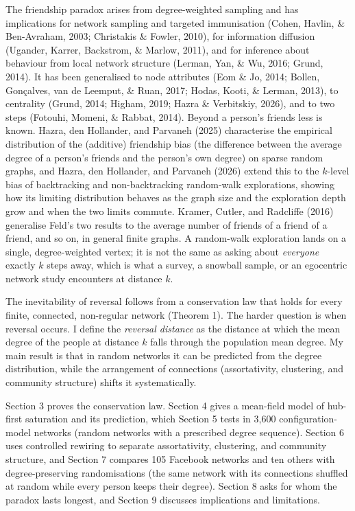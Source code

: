 \documentclass{nws}
\begin{document}
The friendship paradox arises from degree-weighted sampling and has implications for
network sampling and targeted immunisation (Cohen, Havlin, \& Ben-Avraham, 2003;
Christakis \& Fowler, 2010), for information diffusion (Ugander, Karrer, Backstrom, \&
Marlow, 2011), and for inference about behaviour from local network structure (Lerman,
Yan, \& Wu, 2016; Grund, 2014). It has been generalised to node attributes (Eom \& Jo,
2014; Bollen, Gon\c{c}alves, van de Leemput, \& Ruan, 2017; Hodas, Kooti, \& Lerman,
2013), to centrality (Grund, 2014; Higham, 2019; Hazra \& Verbitskiy, 2026), and to two
steps (Fotouhi, Momeni, \& Rabbat, 2014). Beyond a person's friends less is known. Hazra,
den Hollander, and Parvaneh (2025) characterise the empirical distribution of the
(additive) friendship bias (the difference between the average degree of a person's friends and the person's own degree) on sparse random graphs, and Hazra, den Hollander, and
Parvaneh (2026) extend this to the $k$-level bias of backtracking and non-backtracking
random-walk explorations, showing how its limiting distribution behaves as the graph size
and the exploration depth grow and when the two limits commute. Kramer, Cutler, and
Radcliffe (2016) generalise Feld's two results to the average number of friends of a
friend of a friend, and so on, in general finite graphs. A random-walk exploration lands
on a single, degree-weighted vertex; it is not the same as asking about \emph{everyone}
exactly $k$ steps away, which is what a survey, a snowball sample, or an egocentric
network study encounters at distance $k$.

The inevitability of reversal follows from a conservation law that holds for every finite, connected, non-regular network (Theorem 1). The harder question is when reversal occurs. I define the \emph{reversal distance} as the distance at which the mean degree of the people at distance $k$ falls through the population mean degree. My main result is that in random networks it can be predicted from the degree distribution, while the arrangement of connections (assortativity, clustering, and community structure) shifts it systematically.

Section 3 proves the conservation law. Section 4 gives a mean-field model of hub-first saturation and its prediction, which Section 5 tests in 3{,}600 configuration-model networks (random networks with a prescribed degree sequence). Section 6 uses controlled rewiring to separate assortativity, clustering, and community structure, and Section 7 compares 105 Facebook networks and ten others with degree-preserving randomisations (the same network with its connections shuffled at random while every person keeps their degree). Section 8 asks for whom the paradox lasts longest, and Section 9 discusses implications and limitations.
\end{document}
